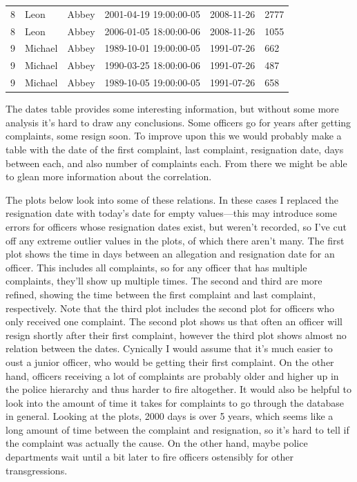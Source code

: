 \documentclass{article}
\begin{document}
\begin{table}[h!]
\begin{tabular}{|l|l|l|l|l|l|}
8  & Leon        & Abbey      & 2001-04-19 19:00:00-05 & 2008-11-26        & 2777          \\
8  & Leon        & Abbey      & 2006-01-05 18:00:00-06 & 2008-11-26        & 1055          \\
9  & Michael     & Abbey      & 1989-10-01 19:00:00-05 & 1991-07-26        & 662           \\
9  & Michael     & Abbey      & 1990-03-25 18:00:00-06 & 1991-07-26        & 487           \\
9  & Michael     & Abbey      & 1989-10-05 19:00:00-05 & 1991-07-26        & 658          
\\
\hline
\end{tabular}
\end{table}

The dates table provides some interesting information, but without some more analysis it's hard to draw any conclusions. Some officers go for years after getting complaints, some resign soon. To improve upon this we would probably make a table with the date of the first complaint, last complaint, resignation date, days between each, and also number of complaints each. From there we might be able to glean more information about the correlation.

The plots below look into some of these relations. In these cases I replaced the resignation date with today's date for empty values---this may introduce some errors for officers whose resignation dates exist, but weren't recorded, so I've cut off any extreme outlier values in the plots, of which there aren't many. The first plot shows the time in days between an allegation and resignation date for an officer. This includes all complaints, so for any officer that has multiple complaints, they'll show up multiple times. The second and third are more refined, showing the time between the first complaint and last complaint, respectively. Note that the third plot includes the second plot for officers who only received one complaint. The second plot shows us that often an officer will resign shortly after their first complaint, however the third plot shows almost no relation between the dates. Cynically I would assume that it's much easier to oust a junior officer, who would be getting their first complaint. On the other hand, officers receiving a lot of complaints are probably older and higher up in the police hierarchy and thus harder to fire altogether. It would also be helpful to look into the amount of time it takes for complaints to go through the database in general. Looking at the plots, 2000 days is over 5 years, which seems like a long amount of time between the complaint and resignation, so it's hard to tell if the complaint was actually the cause. On the other hand, maybe police departments wait until a bit later to fire officers ostensibly for other transgressions.
\end{document}
